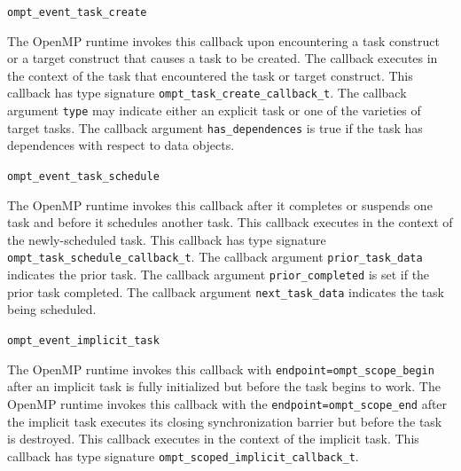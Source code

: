 \documentclass{article}
\newcommand{\descheader}[1]{{\needspace{3\baselineskip}\vspace{1em}\noindent \fbox{#1}}}
\begin{document}
\begin{description}

\item \verb|ompt_event_task_create|
 
The OpenMP runtime invokes this callback
upon encountering a task construct or a target construct that causes a task to be created. 
The callback executes in the context of
the task that encountered the task or target construct.
This callback has type signature \verb|ompt_task_create_callback_t|.
The callback argument \verb|type| may indicate either an explicit task or one of the varieties of target tasks.
The callback argument \verb|has_dependences| is true if the task has dependences with respect to data objects.

\item \verb|ompt_event_task_schedule|

 The OpenMP runtime invokes this callback after it
 completes or suspends one task and before it schedules another task.  This
 callback executes in the context of the newly-scheduled task.  
   This callback has type signature \verb|ompt_task_schedule_callback_t|. 
  The callback argument \verb|prior_task_data| indicates the prior task.
  The callback argument \verb|prior_completed| is set if the prior task completed.
  The callback argument \verb|next_task_data| indicates the task being scheduled. 

\item \verb|ompt_event_implicit_task|

      The OpenMP runtime invokes this callback with \verb|endpoint=|\verb|ompt_scope_begin| after an
   implicit task is fully initialized but before the task begins to work.
   The OpenMP runtime invokes this callback with the \verb|endpoint=|\verb|ompt_scope_end| after the implicit
   task executes its closing synchronization barrier but before
   the task is destroyed.
   This callback executes in the context of the implicit task.
     This callback has type signature \verb|ompt_scoped_implicit_callback_t|. 
   
\end{description}

\descheader{Target Regions}
\end{document}
